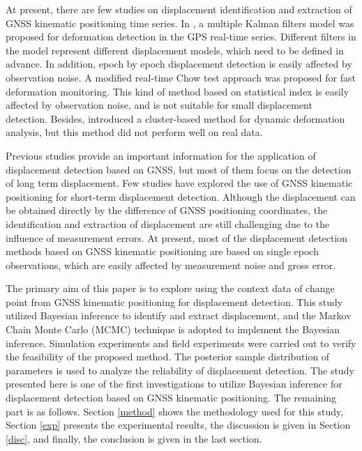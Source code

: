 \documentclass{svjour3}                     %
\begin{document}
At present, there are few studies on displacement identification and extraction of GNSS kinematic positioning time series. In \cite{li2010deformation}, a multiple Kalman filters model was proposed for deformation detection in the GPS real-time series. Different filters in the model represent different displacement models, which need to be defined in advance. In addition, epoch by epoch displacement detection is easily affected by observation noise.
A modified real-time Chow test approach was proposed for fast deformation monitoring\citep{bellone2016real}. This kind of method based on statistical index is easily affected by observation noise, and is not suitable for small displacement detection\citep{pirotti2015micro}. Besides, \cite{dabove2016fast} introduced a cluster-based method for dynamic deformation analysis, but this method did not perform well on real data.

Previous studies provide an important information for the application of displacement detection based on GNSS, but most of them focus on the detection of long term displacement. Few studies have explored the use of GNSS kinematic positioning for short-term displacement detection. Although the displacement can be obtained directly by the difference of GNSS positioning coordinates, the identification and extraction of displacement are still challenging due to the influence of measurement errors.
At present, most of the displacement detection methods based on GNSS kinematic positioning are based on single epoch observations, which are easily affected by measurement noise and gross error.

The primary aim of this paper is to explore using the context data of change point from GNSS kinematic positioning for displacement detection. This study utilized Bayesian inference to identify and extract displacement, and the Markov Chain Monte Carlo (MCMC) technique is adopted to implement the Bayesian inference. Simulation experiments and field experiments were carried out to verify the feasibility of the proposed method. The posterior sample distribution of parameters is used to analyze the reliability of displacement detection. The study presented here is one of the first investigations to utilize Bayesian inference for displacement detection based on GNSS kinematic positioning. The remaining part is as follows. Section \ref{method} shows the methodology used for this study, Section \ref{exp} presents the experimental results, the discussion is given in Section \ref{disc}, and finally, the conclusion is given in the last section.
\end{document}
